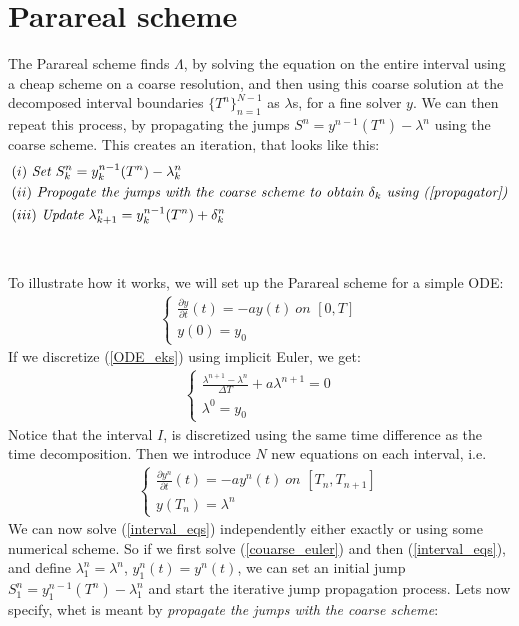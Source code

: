  \section{Parareal scheme}
The Parareal scheme finds $\Lambda$, by solving the equation on the entire interval using a cheap scheme on a coarse resolution, and then using this coarse solution at the decomposed interval boundaries $\{T^n\}_{n=1}^{N-1}$ as $\lambda$s, for a fine solver $y$. We can then repeat this process, by propagating the jumps $S^n=y^{n-1}(T^n)-\lambda^n$ using the coarse scheme. This creates an iteration, that looks like this:
\begin{align*}
&(i) \ \textit{Set $S^n_k = y_k^{n-1}(T^n)-\lambda_k^n$} \\
&(ii) \ \textit{Propogate the jumps with the coarse scheme to obtain $\delta_k$ using (\ref{propagator})} \\
&(iii) \ \textit{Update $\lambda_{k+1}^n=y_k^{n-1}(T^n) + \delta_k^n$}
\end{align*} 
\\
\\
To illustrate how it works, we will set up the Parareal scheme for a simple ODE:
\begin{align}
\left\{
     \begin{array}{lr}
		\frac{\partial y}{\partial t}(t)=-ay(t) \ 				\textit{on $[0,T]$} \\
		y(0)=y_0
	\end{array}
\right.	\label{ODE_eks}
\end{align}
If we discretize (\ref{ODE_eks}) using implicit Euler, we get:
\begin{align}
\left\{
     \begin{array}{lr}
		\frac{\lambda^{n+1}-\lambda^{n}}{\Delta T}+a\lambda^{n+1}=0  \\
		\lambda^0=y_0
	\end{array}
\right.	\label{couarse_euler}
\end{align}
Notice that the interval $I$, is discretized using the same time difference as the time decomposition. Then we introduce $N$ new equations on each interval, i.e.
\begin{align}
\left\{
     \begin{array}{lr}
		\frac{\partial y^n}{\partial t}(t)=-ay^n(t) \ 				\textit{on $[T_n,T_{n+1}]$} \\
		y(T_n)=\lambda^n
	\end{array}
\right. \label{interval_eqs}
\end{align}
We can now solve (\ref{interval_eqs}) independently either exactly or using some numerical scheme. So if we first solve (\ref{couarse_euler}) and then (\ref{interval_eqs}), and define $\lambda_1^n=\lambda^n$, $y_1^n(t)=y^n(t)$, we can set an initial jump $S_1^n=y_1^{n-1}(T^n)-\lambda_1^n$ and start the iterative jump propagation process. Lets now specify, whet is meant by \textit{propagate the jumps with the coarse scheme}:
